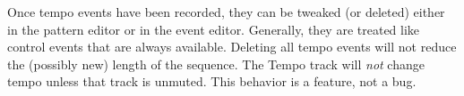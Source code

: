 Once tempo events have been recorded, they can be tweaked (or deleted)
either in the pattern editor or in the event editor.  Generally, they are
treated like control events that are always available.  Deleting all tempo
events will not reduce the (possibly new) length of the sequence.
The Tempo track will \textsl{not} change tempo unless that track is unmuted.
This behavior is a feature, not a bug.


